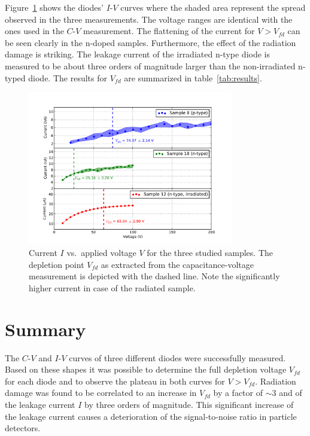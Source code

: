 \documentclass[11pt,a4paper]{report}
\begin{document}
Figure~\ref{fig:iv} shows the diodes' $I$-$V$ curves where the shaded area represent the spread observed in the three measurements.
The voltage ranges are identical with the ones used in the $C$-$V$ measurement.
The flattening of the current for $V>V_{fd}$ can be seen clearly in the n-doped samples.
Furthermore, the effect of the radiation damage is striking. The leakage current of the irradiated n-type diode is measured to be about three orders of magnitude larger than the non-irradiated n-typed diode. The results for $V_{fd}$ are summarized in table~\ref{tab:results}.

\begin{figure}
  \centering
  \includegraphics[width=0.8\textwidth]{./figures/iv.pdf}
  \caption{Current $I$ vs.\ applied voltage $V$ for the three studied samples. The depletion point $V_{fd}$ as extracted from the capacitance-voltage measurement is depicted with the dashed line. Note the significantly higher current in case of the radiated sample.}\label{fig:iv}
\end{figure}



\section*{Summary}
\label{sec:summary}

The $C$-$V$ and $I$-$V$ curves of three different diodes were successfully measured.
Based on these shapes it was possible to determine the full depletion voltage $V_{fd}$ for each diode and to observe the plateau in both curves for $V>V_{fd}$.
Radiation damage was found to be correlated to an increase in $V_{fd}$ by a factor of $\sim 3$ and of the leakage current $I$ by three orders of magnitude.
This significant increase of the leakage current causes a deterioration of the signal-to-noise ratio in particle detectors.

\printbibliography
\end{document}
